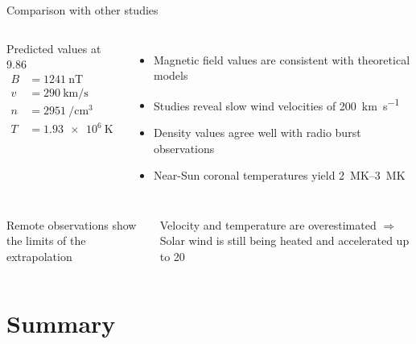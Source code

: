 \begin{frame}[plain,c]{Comparison with other studies}{}
	\begin{columns}[c]
		
		\begin{block}{\centering Predicted values at 9.86\,\Rs{}}
			\begin{align*}
				B &= \SI{1241}{\nano\tesla}\\
				v &= \SI{290}{\km\per\s}\\
				n &= \SI{2951}{\per\cm\cubed}\\
				T &= \SI{1.93e6}{\kelvin}
			\end{align*}
		\end{block}


		\begin{itemize}[<+->]
			\item Magnetic field values are consistent with theoretical models \citep{Parker1958,Banaszkiewicz1998}
			\item Studies reveal slow wind velocities of \SI{200}{\km\per\s} \citep{Sheeley1997,Wang2000}
			\item Density values agree well with radio burst observations \citep{Leblanc1998}
			\item Near-Sun coronal temperatures yield \SIrange{2}{3}{\mega\kelvin} \citep{Billings1959,Liebenberg1975}
		\end{itemize}
	\end{columns}
	
	\vspace{5mm}
	
	\begin{columns}[c]
	\column<+->{\textwidth}
	
	Remote observations show the limits of the extrapolation

	\begin{block}{Velocity and temperature are overestimated}
		\centering $\Rightarrow$ Solar wind is still being heated and accelerated up to 20\,\Rs{}
	\end{block}
	
	\end{columns}
\end{frame}


\section{Summary}


